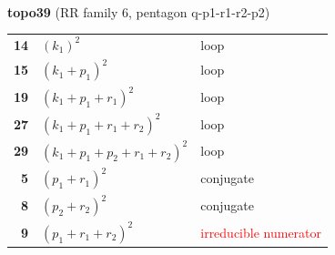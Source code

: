 \documentclass[10pt]{article}
\begin{document}
\begin{minipage}[t]{0.48\textwidth}
{}\\[2mm]\textbf{topo39} (RR family 6, pentagon q-p1-r1-r2-p2)\\[2pt]{\footnotesize\begin{tabular}{@{}r@{\ \ }l@{\ \ }l@{}}\textbf{14} & $(k_1)^2$ & loop\\
\textbf{15} & $(k_1+p_1)^2$ & loop\\
\textbf{19} & $(k_1+p_1+r_1)^2$ & loop\\
\textbf{27} & $(k_1+p_1+r_1+r_2)^2$ & loop\\
\textbf{29} & $(k_1+p_1+p_2+r_1+r_2)^2$ & loop\\
\textbf{5} & $(p_1+r_1)^2$ & conjugate\\
\textbf{8} & $(p_2+r_2)^2$ & conjugate\\
\textbf{9} & $(p_1+r_1+r_2)^2$ & \textcolor{red}{irreducible numerator}\\\end{tabular}}\end{minipage}\hfill%
\end{document}
